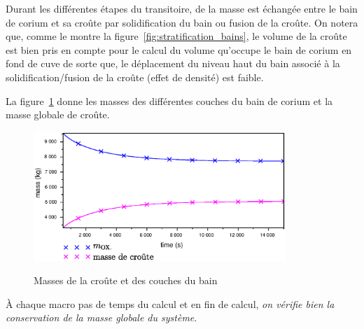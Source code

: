 Durant les différentes étapes du transitoire, de la masse est échangée entre le bain de corium et sa croûte par solidification du bain ou fusion de la croûte. On notera que, comme le montre la figure~\ref{fig:stratification_bains}, le volume de la croûte est bien pris en compte pour le calcul du volume qu'occupe le bain de corium en fond de cuve de sorte que, le déplacement du niveau haut du bain associé à la solidification/fusion de la croûte (effet de densité) est faible.

La figure~\ref{fig:mass_balance} donne les masses des différentes couches du bain de corium et la masse globale de croûte.
\begin{figure}[H]
\centering
\includegraphics[width=0.85\textwidth, keepaspectratio=true]{Figures/mass_balance.eps}\\
\caption{Masses de la croûte et des couches du bain}
\label{fig:mass_balance}
\end{figure}
À chaque macro pas de temps du calcul et en fin de calcul, \emph{on vérifie bien la conservation de la masse globale du système}.

